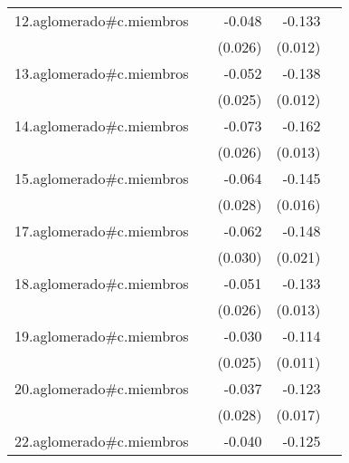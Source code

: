 {\begin{longtable}{l*{4}{D{.}{.}{-1}}}
\addlinespace
12.aglomerado#c.miembros&                     &      -0.048         &      -0.133\sym{***}&                     \\
            &                     &     (0.026)         &     (0.012)         &                     \\
\addlinespace
13.aglomerado#c.miembros&                     &      -0.052\sym{*}  &      -0.138\sym{***}&                     \\
            &                     &     (0.025)         &     (0.012)         &                     \\
\addlinespace
14.aglomerado#c.miembros&                     &      -0.073\sym{**} &      -0.162\sym{***}&                     \\
            &                     &     (0.026)         &     (0.013)         &                     \\
\addlinespace
15.aglomerado#c.miembros&                     &      -0.064\sym{*}  &      -0.145\sym{***}&                     \\
            &                     &     (0.028)         &     (0.016)         &                     \\
\addlinespace
17.aglomerado#c.miembros&                     &      -0.062\sym{*}  &      -0.148\sym{***}&                     \\
            &                     &     (0.030)         &     (0.021)         &                     \\
\addlinespace
18.aglomerado#c.miembros&                     &      -0.051\sym{*}  &      -0.133\sym{***}&                     \\
            &                     &     (0.026)         &     (0.013)         &                     \\
\addlinespace
19.aglomerado#c.miembros&                     &      -0.030         &      -0.114\sym{***}&                     \\
            &                     &     (0.025)         &     (0.011)         &                     \\
\addlinespace
20.aglomerado#c.miembros&                     &      -0.037         &      -0.123\sym{***}&                     \\
            &                     &     (0.028)         &     (0.017)         &                     \\
\addlinespace
22.aglomerado#c.miembros&                     &      -0.040         &      -0.125\sym{***}&                     \\

\end{longtable}}
